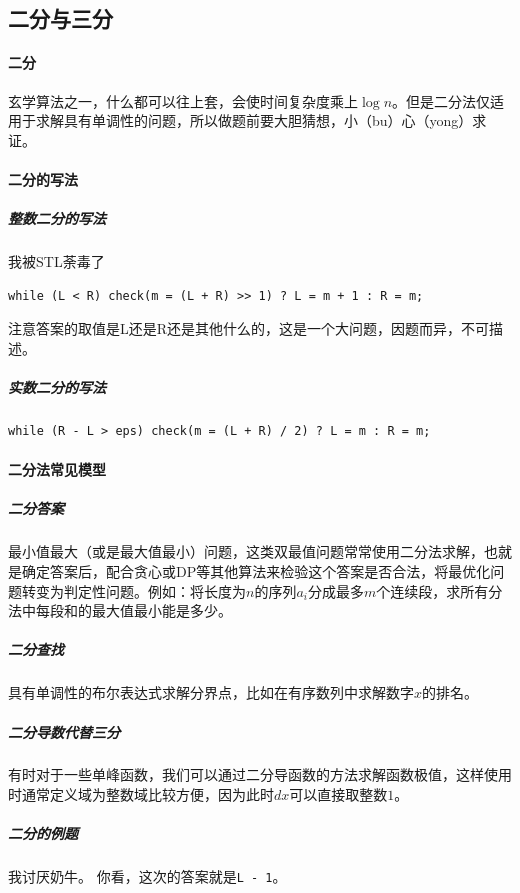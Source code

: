 \documentclass[]{cpp}
\begin{document}
\subsection{二分与三分}
\paragraph{二分} 玄学算法之一，什么都可以往上套，会使时间复杂度乘上$\log{n}$。但是二分法仅适用于求解具有单调性的问题，所以做题前要大胆猜想，小（bu）心（yong）求证。
\paragraph{二分的写法}
\subparagraph{整数二分的写法}
	我被STL荼毒了
	\begin{verbatim}while (L < R) check(m = (L + R) >> 1) ? L = m + 1 : R = m;\end{verbatim}
	注意答案的取值是L还是R还是其他什么的，这是一个大问题，因题而异，不可描述。
\subparagraph{实数二分的写法} \begin{verbatim}while (R - L > eps) check(m = (L + R) / 2) ? L = m : R = m;\end{verbatim}
\paragraph{二分法常见模型}
\subparagraph{二分答案}
	最小值最大（或是最大值最小）问题，这类双最值问题常常使用二分法求解，也就是确定答案后，配合贪心或DP等其他算法来检验这个答案是否合法，将最优化问题转变为判定性问题。例如：将长度为$n$的序列$a_i$分成最多$m$个连续段，求所有分法中每段和的最大值最小能是多少。
\subparagraph{二分查找}
	具有单调性的布尔表达式求解分界点，比如在有序数列中求解数字$x$的排名。
\subparagraph{二分导数代替三分}
	有时对于一些单峰函数，我们可以通过二分导函数的方法求解函数极值，这样使用时通常定义域为整数域比较方便，因为此时$dx$可以直接取整数$1$。
\subparagraph{二分的例题} 我讨厌奶牛。
	你看，这次的答案就是\verb|L - 1|。
\end{document}
